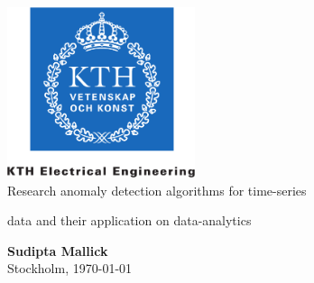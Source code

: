 \documentclass[../report.tex]{subfiles}
\begin{document}
	
    \begin{titlepage}
        \thispagestyle{empty}
        \begin{center}
            \includegraphics[height=5cm]{./Ch0.2-Title/kth_cmyk_info_comm_tech}\\
            \vspace{2.5cm}
	            \huge{Research anomaly detection algorithms for time-series}
	        \begin{adjustwidth*}{-0.1cm}{-0.1cm}
	        	\huge{data and their application on data-analytics}\\
		    \end{adjustwidth*}
            \vspace{4cm}
            \Large{\textbf{Sudipta Mallick}}\\
            \vspace{4cm}
            \Large{Stockholm, \today}
        \end{center} 
    \end{titlepage}
\end{document}
